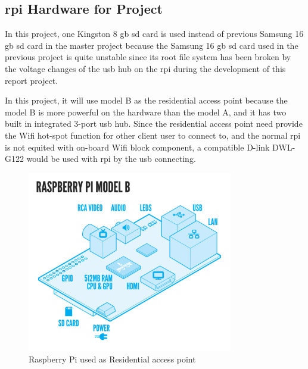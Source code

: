 \subsection{\gls{rpi} Hardware for Project}
\par In this project, one Kingston 8 \gls{gb} \gls{sd} card is used instead of previous Samsung 16 \gls{gb} \gls{sd} card in the master project\cite{TorgeirMR} because the Samsung 16 \gls{gb} \gls{sd} card used in the previous project is quite unstable since its root file system has been broken by the voltage changes of the \gls{usb} hub on the \gls{rpi} during the development of this report project. 
\par In this project, it will use model B as the residential access point because the model B is more powerful on the hardware than the model A, and it has two built in integrated 3-port \gls{usb} hub. Since the residential access point need provide the Wifi hot-spot function for other client user to connect to, and the normal \gls{rpi} is not equited with on-board Wifi block component, a compatible D-link DWL-G122 would be used with \gls{rpi} by the \gls{usb} connecting.
\begin{figure}
	\centering
    	\includegraphics[width=0.80\textwidth]{figs/RaspiModelB.png}
  	\caption{Raspberry Pi used as Residential access point}
  	\label{fig:rpi}
\end{figure}

